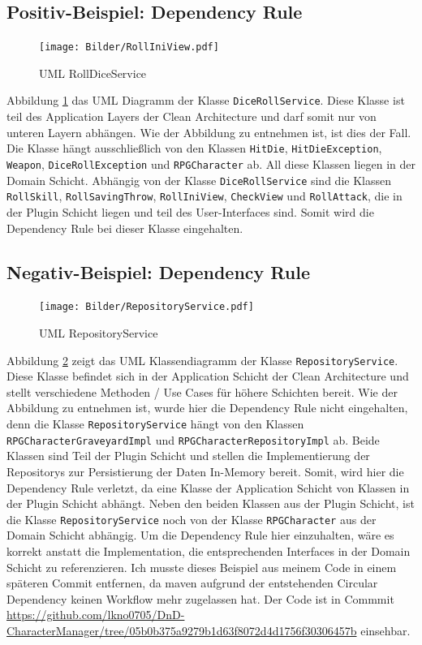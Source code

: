 \subsection{Positiv-Beispiel: Dependency Rule}
\begin{figure}[H]
	\centering
	\texttt{[image: Bilder/RollIniView.pdf]}
	\caption{UML RollDiceService}
	\label{fig:RollDiceServiceDependencys}
\end{figure}
Abbildung \ref{fig:RollDiceServiceDependencys} das UML Diagramm der Klasse \texttt{DiceRollService}. Diese Klasse ist teil des Application Layers der Clean Architecture und darf somit nur von unteren Layern abhängen. Wie der Abbildung zu entnehmen ist, ist dies der Fall. Die Klasse hängt ausschließlich von den Klassen \texttt{HitDie}, \texttt{HitDieException}, \texttt{Weapon}, \texttt{DiceRollException} und \texttt{RPGCharacter} ab. All diese Klassen liegen in der Domain Schicht. Abhängig von der Klasse \texttt{DiceRollService} sind die Klassen \texttt{RollSkill}, \texttt{RollSavingThrow}, \texttt{RollIniView}, \texttt{CheckView} und \texttt{RollAttack}, die in der Plugin Schicht liegen und teil des User-Interfaces sind. Somit wird die Dependency Rule bei dieser Klasse eingehalten.


\subsection{Negativ-Beispiel: Dependency Rule}
\begin{figure}[H]
	\centering
	\texttt{[image: Bilder/RepositoryService.pdf]}
	\caption{UML RepositoryService}
	\label{fig:RepositoryService}
\end{figure}
Abbildung \ref{fig:RepositoryService} zeigt das UML Klassendiagramm der Klasse \texttt{RepositoryService}. Diese Klasse befindet sich in der Application Schicht der Clean Architecture und stellt verschiedene Methoden / Use Cases für höhere Schichten bereit. Wie der Abbildung zu entnehmen ist, wurde hier die Dependency Rule nicht eingehalten, denn die Klasse \texttt{RepositoryService} hängt von den Klassen \texttt{RPGCharacterGraveyardImpl} und \texttt{RPGCharacterRepositoryImpl} ab. Beide Klassen sind Teil der Plugin Schicht und stellen die Implementierung der Repositorys zur Persistierung der Daten In-Memory bereit. Somit, wird hier die Dependency Rule verletzt, da eine Klasse der Application Schicht von Klassen in der Plugin Schicht abhängt. Neben den beiden Klassen aus der Plugin Schicht, ist die Klasse \texttt{RepositoryService} noch von der Klasse \texttt{RPGCharacter} aus der Domain Schicht abhängig. Um die Dependency Rule hier einzuhalten, wäre es korrekt anstatt die Implementation, die entsprechenden Interfaces in der Domain Schicht zu referenzieren.
Ich musste dieses Beispiel aus meinem Code in einem späteren Commit entfernen, da maven aufgrund der entstehenden Circular Dependency keinen Workflow mehr zugelassen hat. Der Code ist in Commmit \href{https://github.com/lkno0705/DnD-CharacterManager/tree/05b0b375a9279b1d63f8072d4d1756f30306457b}{https://github.com/lkno0705/DnD-CharacterManager/tree/05b0b375a9279b1d63f8072d4d1756f30306457b} einsehbar.

